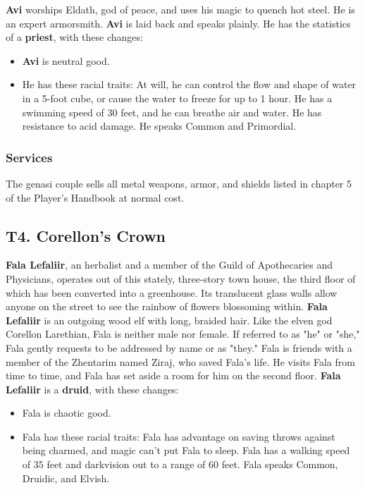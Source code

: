 \documentclass[10pt,a4paper,twoside,twocolumn,openany,nodeprecatedcode]{dndbook}
\begin{document}
\textbf{Avi} worships Eldath, god of peace, and uses his magic to quench hot steel. He is an expert armorsmith. \textbf{Avi} is laid back and speaks plainly. He has the statistics of a \textbf{priest}, with these changes:
\begin{itemize}

\item \textbf{Avi} is neutral good.
\item He has these racial traits: At will, he can control the flow and shape of water in a 5-foot cube, or cause the water to freeze for up to 1 hour. He has a swimming speed of 30 feet, and he can breathe air and water. He has resistance to acid damage. He speaks Common and Primordial.
\end{itemize}


\subsubsection{Services}
The genasi couple sells all metal weapons, armor, and shields listed in chapter 5 of the Player's Handbook at normal cost.
\subsection{T4. Corellon's Crown}
\textbf{Fala Lefaliir}, an herbalist and a member of the Guild of Apothecaries and Physicians, operates out of this stately, three-story town house, the third floor of which has been converted into a greenhouse. Its translucent glass walls allow anyone on the street to see the rainbow of flowers blossoming within.
\textbf{Fala Lefaliir} is an outgoing wood elf with long, braided hair. Like the elven god Corellon Larethian, Fala is neither male nor female. If referred to as "he" or "she," Fala gently requests to be addressed by name or as "they." Fala is friends with a member of the Zhentarim named Ziraj, who saved Fala's life. He visits Fala from time to time, and Fala has set aside a room for him on the second floor.
\textbf{Fala Lefaliir} is a \textbf{druid}, with these changes:
\begin{itemize}

\item Fala is chaotic good.
\item Fala has these racial traits: Fala has advantage on saving throws against being charmed, and magic can't put Fala to sleep. Fala has a walking speed of 35 feet and darkvision out to a range of 60 feet. Fala speaks Common, Druidic, and Elvish.
\end{itemize}
\end{document}
